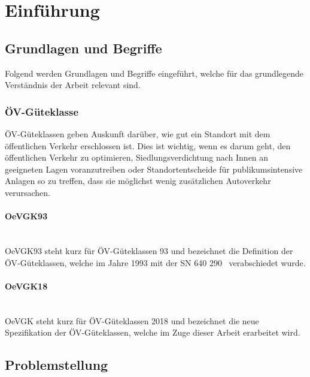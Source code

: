
\section{Einführung}
\label{Einführung}


\subsection{Grundlagen und Begriffe}
\label{Einführung:Grundlagen und Begriffe}

Folgend werden Grundlagen und Begriffe eingeführt, welche für das grundlegende Verständnis der Arbeit relevant sind.

\subsubsection{ÖV-Güteklasse}
\label{Grundlagen und Begriffe:ÖV-Güteklasse}

\acs{ÖV}-Güteklassen geben Auskunft darüber, wie gut ein Standort mit dem öffentlichen Verkehr erschlossen ist.
Dies ist wichtig, wenn es darum geht, den öffentlichen Verkehr zu optimieren, Siedlungsverdichtung nach Innen an geeigneten Lagen voranzutreiben oder Standortentscheide für publikumsintensive Anlagen so zu treffen, dass sie möglichst wenig zusätzlichen Autoverkehr verursachen.~\cite{oev-guteklasse-gr-defintion}

\paragraph{OeVGK93}~\\
OeVGK93 steht kurz für \acs{ÖV}-Güteklassen 93 und bezeichnet die Definition der \acs{ÖV}-Güteklassen, welche im Jahre 1993 mit der \acs{SN} 640 290~\cite{sn640290} verabschiedet wurde.

\paragraph{OeVGK18}~\\
OeVGK steht kurz für \acs{ÖV}-Güteklassen 2018 und bezeichnet die neue Spezifikation der \acs{ÖV}-Güteklassen, welche im Zuge dieser Arbeit erarbeitet wird.

\subsection{Problemstellung}
\label{Einführung:Problemstellung}

